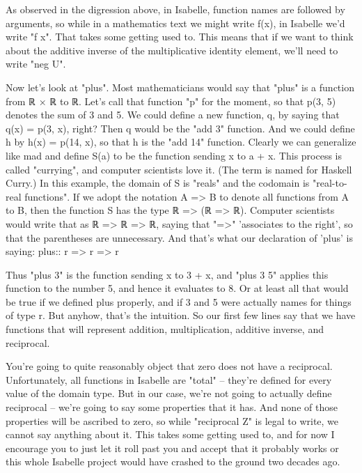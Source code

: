 As observed in the digression above, in Isabelle, function names are followed by arguments, so while in a mathematics text we might write f(x), in Isabelle we'd write "f x". That takes some getting used to. This means that if we want to think about the additive inverse of the multiplicative identity element, we'll need to write "neg U".

Now let's look at "plus". Most mathematicians would say that "plus" is a function from ℝ × ℝ to ℝ. Let's call that function "p" for the moment, so that p(3, 5) denotes the sum of 3 and 5. We could define a new function, q, by saying that q(x) = p(3, x), right? Then q would be the "add 3" function. And we could define h by h(x) = p(14, x), so that h is the "add 14" function. Clearly we can generalize like mad and define S(a) to be the function sending x to a + x. This process is called "currying", and computer scientists love it. (The term is named for Haskell Curry.) In this example, the domain of S is "reals" and the codomain is "real-to-real functions". If we adopt the notation A => B to denote all functions from A to B, then the function S has the type
ℝ => (ℝ => ℝ). Computer scientists would write that as ℝ => ℝ => ℝ, saying that "=>" 'associates to the right', so that the parentheses are unnecessary. 
And that's what our declaration of 'plus' is saying: 
plus:: r => r => r


Thus "plus 3" is the function sending x to 3 + x, and "plus 3 5" applies this function to the number 5, and hence it evaluates to 8. Or at least all that would be true if we defined plus properly, and if 3 and 5 were actually names for things of type r. But anyhow, that's the intuition. So our first few lines say that we have functions that will represent addition, multiplication, additive inverse, and reciprocal. 

You're going to quite reasonably object that zero does not have a reciprocal. Unfortunately, all functions in Isabelle are "total" -- they're defined for every value of the domain type. But in our case, we're not going to actually define reciprocal -- we're going to say some properties that it has. And none of those properties will be ascribed to zero, so while "reciprocal Z" is legal to write, we cannot say anything about it. This takes some getting used to, and for now I encourage you to just let it roll past you and accept that it probably works or this whole Isabelle project would have crashed to the ground two decades ago. 

